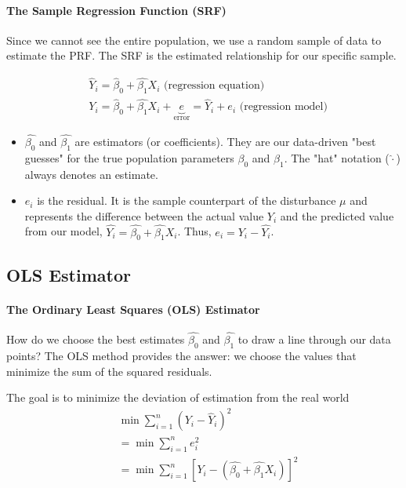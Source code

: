 \documentclass{article}
\begin{document}
\paragraph{The Sample Regression Function (SRF)}

Since we cannot see the entire population, we use a random sample of data to estimate the PRF. The SRF is the estimated relationship for our specific sample.

\begin{align}
  &\hat Y_i =\hat \beta_0 +\hat{\beta_{1}}X_i \text{ (regression equation)}
  \\& Y_i=\hat \beta_0 +\hat{\beta_{1}}X_i+
  \underbrace{e}_\text{error}
  =\hat Y_i + e_i
  \text{ (regression model)}
\end{align}

\begin{itemize}
  \item $\hat{\beta_0}$ and $\hat{\beta_1}$ are estimators (or coefficients). They are our data-driven "best guesses" for the true population parameters $\beta_0$ and $\beta_1$. The "hat" notation ($\hat{\cdot}$) always denotes an estimate.
  \item $e_i$ is the residual. It is the sample counterpart of the disturbance $\mu$ and represents the difference between the actual value $Y_i$ and the predicted value from our model, $\hat{Y_i} = \hat{\beta_0} +\hat{\beta_{1}}X_i$. Thus, $e_i = Y_i - \hat{Y_i}$.
\end{itemize}



\subsection{OLS Estimator} %
\label{sub:ols_estimator}


\paragraph{The Ordinary Least Squares (OLS) Estimator}

How do we choose the best estimates $\hat{\beta_0}$ and $\hat{\beta_1}$ to draw a line through our data points? The OLS method provides the answer: we choose the values that minimize the sum of the squared residuals.

The goal is to minimize the deviation of estimation from the real world
\begin{align}
  & \min \sum\limits_{i=1}^n (Y_i-\hat Y_i)^2
  \\& =\min \sum\limits_{i=1}^n e_i^2
  \\& =\min \sum\limits_{i=1}^n [Y_i-(\hat{\beta_{0}}+\hat{\beta_{1}}X_i)]^2
\end{align}
\end{document}
